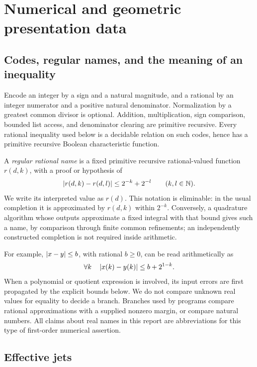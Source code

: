 \section{Numerical and geometric presentation data}\label{sec:data}

\subsection{Codes, regular names, and the meaning of an inequality}

Encode an integer by a sign and a natural magnitude, and a rational by an integer numerator and a positive natural denominator. Normalization by a greatest common divisor is optional. Addition, multiplication, sign comparison, bounded list access, and denominator clearing are primitive recursive. Every rational inequality used below is a decidable relation on such codes, hence has a primitive recursive Boolean characteristic function.

A \emph{regular rational name} is a fixed primitive recursive rational-valued function $r(d,k)$, with a proof or hypothesis of
\begin{equation}\label{eq:regular}
\left|r(d,k)-r(d,l)\right|\le 2^{-k}+2^{-l}\qquad(k,l\in\mathbb N).
\end{equation}
We write its interpreted value as $r(d)$. This notation is eliminable: in the usual completion it is approximated by $r(d,k)$ within $2^{-k}$. Conversely, a quadrature algorithm whose outputs approximate a fixed integral with that bound gives such a name, by comparison through finite common refinements; an independently constructed completion is not required inside arithmetic.

For example, $\left|x-y\right|\le b$, with rational $b\ge0$, can be read arithmetically as
\[
\forall k\quad\left|x(k)-y(k)\right|\le b+2^{1-k}.
\]
When a polynomial or quotient expression is involved, its input errors are first propagated by the explicit bounds below. We do not compare unknown real values for equality to decide a branch. Branches used by programs compare rational approximations with a supplied nonzero margin, or compare natural numbers. All claims about real names in this report are abbreviations for this type of first-order numerical assertion.

\subsection{Effective jets}

